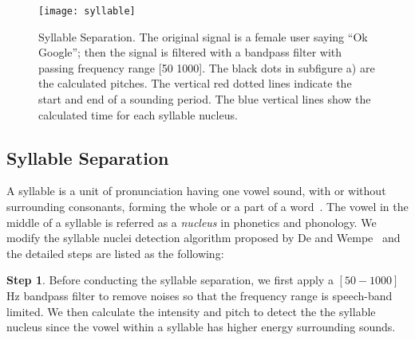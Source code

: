 %
\begin{figure}[t]
	\centering
	\texttt{[image: syllable]}
	\caption[Syllable Separation]{Syllable Separation. The original signal is a female user saying ``Ok Google''; then the signal is filtered with a bandpass filter with passing frequency range [50 1000]. The black dots in subfigure a) are the calculated pitches. The vertical red dotted lines indicate the start and end of a sounding period. The blue vertical lines show the calculated time for each syllable nucleus.}
	\label{fig:syllable}
\end{figure}

\subsection{Syllable Separation}
A syllable is a unit of pronunciation having one vowel sound, with or without surrounding consonants, forming the whole or a part of a word~\cite{onlinesyllable}. The vowel in the middle of a syllable is referred as a \textit{nucleus} in phonetics and phonology. We modify the syllable nuclei detection algorithm proposed by De and Wempe~\cite{de2009praat} and the detailed steps are listed as the following:


\textbf{Step 1}. 
Before conducting the syllable separation, we first apply a $\left[50-1000\right]$ Hz bandpass filter to remove noises so that the frequency range is speech-band limited. We then calculate the intensity and pitch to detect the the syllable nucleus since the vowel within a syllable has higher energy surrounding sounds. 
%



%
%
%
%

